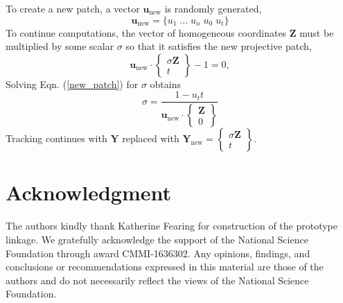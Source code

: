 \documentclass[journal]{IEEEtran}
\begin{document}
To create a new patch, a vector $\mathbf{u}_\text{new}$ is randomly generated,
\begin{equation}
\mathbf{u}_\text{new} = \{ u_1 \; \ldots \; u_n \; u_0 \; u_t \}
\end{equation}
To continue computations, the vector of homogeneous coordinates $\mathbf{Z}$ must be multiplied by some scalar $\sigma$ so that it satisfies the new projective patch,
\begin{equation}
\mathbf{u}_\text{new} \cdot \begin{Bmatrix} \sigma\mathbf{Z} \\ t \end{Bmatrix}  - 1 = 0,
\label{new_patch}
\end{equation}
Solving Eqn. (\ref{new_patch}) for $\sigma$ obtains
\begin{equation}
\sigma = \frac{1 - u_t t}{\mathbf{u}_\text{new} \cdot \begin{Bmatrix} \mathbf{Z} \\ 0 \end{Bmatrix}}
\end{equation}
Tracking continues with $\mathbf{Y}$ replaced with $\mathbf{Y}_\text{new} = \begin{Bmatrix} \sigma\mathbf{Z} \\ t \end{Bmatrix}$.






\section*{Acknowledgment}

The authors kindly thank Katherine Fearing for construction of the prototype linkage.
We gratefully acknowledge the support of the National Science Foundation through award CMMI-1636302.  Any opinions, findings, and conclusions or recommendations expressed in this material are those of the authors and do not necessarily reflect the views of the National Science Foundation.


\ifCLASSOPTIONcaptionsoff
  \newpage
\fi







% 
\end{document}
